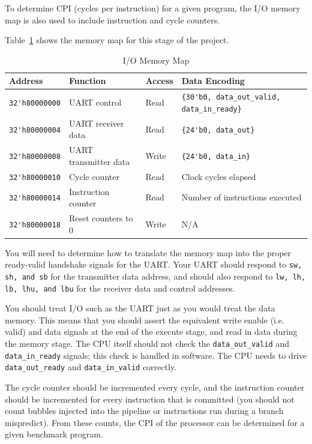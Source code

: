 \documentclass[11pt]{article}
\begin{document}
To determine CPI (cycles per instruction) for a given program, the I/O memory map is also used to include instruction and cycle counters.

Table~\ref{mem_map1} shows the memory map for this stage of the project.

\begin{table}[hbt]
  \begin{center}
    \caption{I/O Memory Map}
    \label{mem_map1}
    \begin{tabular}{l l l l}
      \toprule
      \textbf{Address} & \textbf{Function} & \textbf{Access} & \textbf{Data Encoding}\\
      \midrule
      \verb|32'h80000000| & UART control & Read & \verb|{30'b0, data_out_valid, data_in_ready}| \\
      \verb|32'h80000004| & UART receiver data & Read & \verb|{24'b0, data_out}| \\
      \verb|32'h80000008| & UART transmitter data & Write & \verb|{24'b0, data_in}| \\
      \midrule
      \verb|32'h80000010| & Cycle counter & Read & Clock cycles elapsed \\
      \verb|32'h80000014| & Instruction counter & Read & Number of instructions executed \\
      \verb|32'h80000018| & Reset counters to 0 & Write & N/A \\
      \bottomrule
    \end{tabular}
  \end{center}
\end{table}

You will need to determine how to translate the memory map into the proper ready-valid handshake signals for the UART.
Your UART should respond to \verb|sw, sh, and sb| for the transmitter data address, and should also respond to \verb|lw, lh, lb, lhu, and lbu| for the receiver data and control addresses.

You should treat I/O such as the UART just as you would treat the data memory.
This means that you should assert the equivalent write enable (i.e. valid) and data signals at the end of the execute stage, and read in data during the memory stage.
The CPU itself should not check the \verb|data_out_valid| and \verb|data_in_ready| signals; this check is handled in software.
The CPU needs to drive \verb|data_out_ready| and \verb|data_in_valid| correctly.

The cycle counter should be incremented every cycle, and the instruction counter should be incremented for every instruction that is committed (you should not count bubbles injected into the pipeline or instructions run during a branch mispredict).
From these counts, the CPI of the processor can be determined for a given benchmark program.
\end{document}
